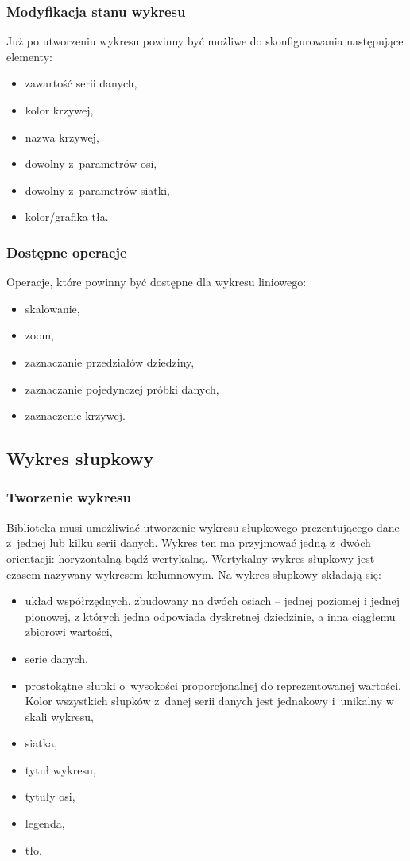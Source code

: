 \documentclass[11pt,twoside,a4paper,final]{article}
\begin{document}
\subsubsection{Modyfikacja stanu wykresu}
Już po utworzeniu wykresu powinny być możliwe do skonfigurowania następujące elementy:
\begin{itemize}
\item{zawartość serii danych,}
\item{kolor krzywej,}
\item{nazwa krzywej,}
\item{dowolny z~parametrów osi,}
\item{dowolny z~parametrów siatki,}
\item{kolor/grafika tła.}
\end{itemize}

\subsubsection{Dostępne operacje}
Operacje, które powinny być dostępne dla wykresu liniowego:
\begin{itemize}
\item{skalowanie,}
\item{zoom,}
\item{zaznaczanie przedziałów dziedziny,}
\item{zaznaczanie pojedynczej próbki danych,}
\item{zaznaczenie krzywej.}
\end{itemize}

\subsection{Wykres słupkowy}
\subsubsection{Tworzenie wykresu}
Biblioteka musi umożliwiać utworzenie wykresu słupkowego prezentującego dane z~jednej lub kilku serii danych. Wykres ten ma przyjmować jedną z~dwóch orientacji: horyzontalną bądź wertykalną. Wertykalny wykres słupkowy jest czasem nazywany wykresem kolumnowym. Na wykres słupkowy składają się:
\begin{itemize}
\item{układ współrzędnych, zbudowany na dwóch osiach -- jednej poziomej i jednej pionowej, z których jedna odpowiada dyskretnej dziedzinie, a inna ciągłemu zbiorowi wartości,}
\item{serie danych,}
\item{prostokątne słupki o~wysokości proporcjonalnej do reprezentowanej wartości. Kolor wszystkich słupków z~danej serii danych jest jednakowy i~unikalny w skali wykresu,}
\item{siatka,}
\item{tytuł wykresu,}
\item{tytuły osi,}
\item{legenda,}
\item{tło.}
\end{itemize}
\end{document}
